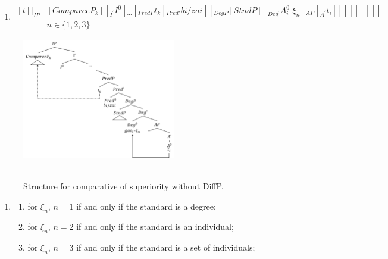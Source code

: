 \documentclass{ctexart}
\begin{document}
\begin{enumerate}
    \item \label{superiority_structure}
    $\begin{aligned}[t]
        [_{IP} &[CompareeP_k] [_{I^{\prime}} I^{0} [_{...}[_{PredP} t_k [_{Pred'} bi/zai [[_{DegP} [StndP] [_{Deg^{\prime}} A_i^0\mbox{-}\xi_{n} [_{AP} [_{A^{\prime}} t_i]]]]]]]]]] \\ 
        &n \in \{1, 2, 3\}
    \end{aligned}$
\end{enumerate}

\begin{figure}[H]
    \centering
    \includegraphics[width=0.6\textwidth]{pic/superiority_structure.png}
    \begin{caption}
        \\ \vspace{-1.1ex}
        Structure for comparative of superiority without DiffP.
    \end{caption}
\end{figure}

\begin{enumerate}
    \item \label{superiority_example_2}
    \begin{enumerate}
        \item \label{superiority_example_2_a}
        for $\xi_n$, $n=1$ if and only if the standard is a degree;

        \item \label{superiority_example_2_b}
        for $\xi_n$, $n=2$ if and only if the standard is an individual;

        \item \label{superiority_example_2_c}
        for $\xi_n$, $n=3$ if and only if the standard is a set of individuals;

    \end{enumerate}
\end{enumerate}
\end{document}
